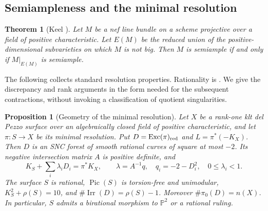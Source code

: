 \documentclass[11pt,reqno]{amsart}
\newtheorem{theorem}{Theorem}[section]
\newtheorem{proposition}[proposition]{Proposition}
\theoremstyle{definition}
\theoremstyle{remark}
\DeclareMathOperator{\Exc}{Exc}
\DeclareMathOperator{\Pic}{Pic}
\DeclareMathOperator{\Irr}{Irr}
\newcommand{\PP}{\mathbb P}
\numberwithin{equation}{section}
\begin{document}
\subsection{Semiampleness and the minimal resolution}

\begin{theorem}[Keel {\cite[Theorem~0.2]{Keel}}]\label{thm:keel}
Let $M$ be a nef line bundle on a scheme projective over a field of positive characteristic.  Let $E(M)$ be the reduced union of the positive-dimensional subvarieties on which $M$ is not big.  Then $M$ is semiample if and only if $M|_{E(M)}$ is semiample.
\end{theorem}



The following collects standard resolution properties. Rationality is
\cite[Lemma~5.1]{Bernasconi}. We give the discrepancy and rank arguments
in the form needed for the subsequent contractions, without invoking
a classification of quotient singularities.

\begin{proposition}[Geometry of the minimal resolution]
\label{prop:minimal-resolution}
Let $X$ be a rank-one klt del Pezzo surface over an algebraically closed
field of positive characteristic, and let $\pi:S\to X$ be its minimal
resolution. Put $D=\Exc(\pi)_{\rm red}$ and $L=\pi^*(-K_X)$.
Then $D$ is an SNC forest of smooth rational curves of square at most
$-2$. Its negative intersection matrix $A$ is positive definite, and
\[
 K_S+\sum_i\lambda_iD_i=\pi^*K_X,\qquad
 \lambda=A^{-1}q,\quad q_i=-2-D_i^2,\quad 0\le\lambda_i<1.
\]
The surface $S$ is rational, $\Pic(S)$ is torsion-free and unimodular,
$K_S^2+\rho(S)=10$, and $\#\Irr(D)=\rho(S)-1$. Moreover
$\#\pi_0(D)=n(X)$.
In particular, $S$ admits a birational morphism to $\PP^2$ or a
rational ruling. 
\end{proposition}
\end{document}
